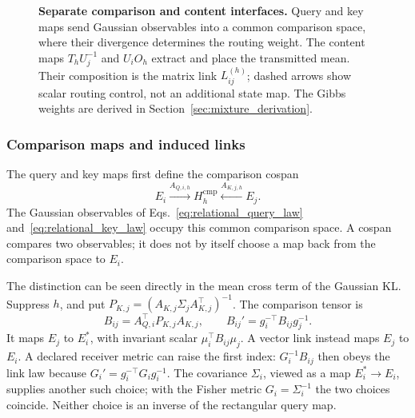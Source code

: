 \documentclass[twoside,11pt]{article}
\begin{document}
\begin{figure}[htbp]
{
}
\caption{\textbf{Separate comparison and content interfaces.}
Query and key maps send Gaussian observables into a common comparison space, where their divergence determines the routing weight. The content maps \(T_hU_j^{-1}\) and \(U_iO_h\) extract and place the transmitted mean. Their composition is the matrix link \(L_{ij}^{(h)}\); dashed arrows show scalar routing control, not an additional state map. The Gibbs weights are derived in Section~\ref{sec:mixture_derivation}.}
\label{fig:comparison_content_interfaces}
\end{figure}

\subsubsection{Comparison maps and induced links}

The query and key maps first define the comparison cospan
\begin{equation}
E_i\xrightarrow{A_{Q,i,h}}H_h^{\mathrm{cmp}}
\xleftarrow{A_{K,j,h}}E_j.
\label{eq:comparison_cospan}
\end{equation}
The Gaussian observables of Eqs.~\eqref{eq:relational_query_law} and~\eqref{eq:relational_key_law} occupy this common comparison space. A cospan compares two observables; it does not by itself choose a map back from the comparison space to $E_i$.

The distinction can be seen directly in the mean cross term of the Gaussian KL. Suppress $h$, and put $P_{K,j}=(A_{K,j}\Sigma_jA_{K,j}^\top)^{-1}$. The comparison tensor is
\begin{equation}
B_{ij}=A_{Q,i}^\top P_{K,j}A_{K,j},\qquad
B_{ij}'=g_i^{-\top}B_{ij}g_j^{-1}.
\label{eq:comparison_bilinear_tensor}
\end{equation}
It maps $E_j$ to $E_i^*$, with invariant scalar $\mu_i^\top B_{ij}\mu_j$. A vector link instead maps $E_j$ to $E_i$. A declared receiver metric can raise the first index: $G_i^{-1}B_{ij}$ then obeys the link law because $G_i'=g_i^{-\top}G_ig_i^{-1}$. The covariance $\Sigma_i$, viewed as a map $E_i^*\to E_i$, supplies another such choice; with the Fisher metric $G_i=\Sigma_i^{-1}$ the two choices coincide. Neither choice is an inverse of the rectangular query map.
\end{document}
